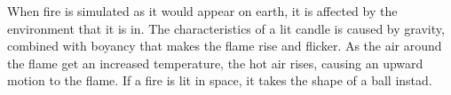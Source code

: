 When fire is simulated as it would appear on earth, it is affected by the environment that it is in. 
The characteristics of a lit candle is caused by gravity, combined with boyancy that makes the flame rise and flicker. 
As the air around the flame get an increased temperature, the hot air rises, causing an upward motion to the flame.
If a fire is lit in space, it takes the shape of a ball instad.
